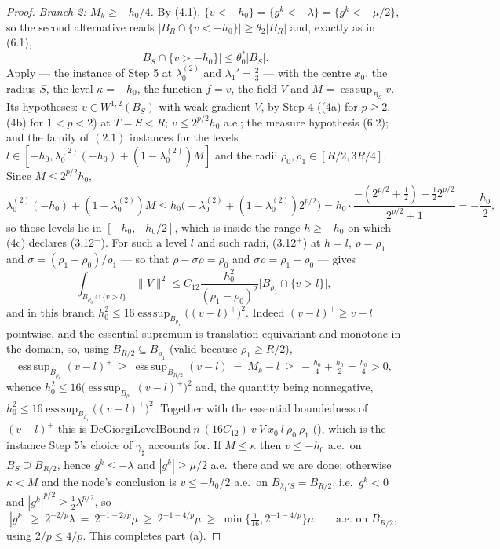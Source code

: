 \begin{proof}
\emph{Branch 2: $M_k\ge-h_0/4$.}  By (4.1),
$\{v<-h_0\}=\{g^k<-\lambda\}=\{g^k<-\mu/2\}$, so the second alternative reads
$|B_R\cap\{v<-h_0\}|\ge\theta_2|B_R|$ and, exactly as in (6.1),
\[
\bigl|B_S\cap\{v>-h_0\}\bigr|\le\theta_0^\ast|B_S| .
\tag{6.2}
\]
Apply  --- the instance of Step 5 at
$\lambda_0^{(2)}$ and $\lambda_1'=\tfrac23$ --- with the centre $x_0$, the
radius $S$, the level $\kappa=-h_0$, the function $f=v$, the field $V$ and
$M=\operatorname{ess\,sup}_{B_S}v$.  Its hypotheses: $v\in W^{1,2}(B_S)$ with
weak gradient $V$, by Step 4 ((4a) for $p\ge2$, (4b) for $1<p<2$) at $T=S<R$;
$v\le2^{p/2}h_0$ a.e.; the measure hypothesis (6.2); and the family of $(2.1)$
instances for the levels
$l\in[-h_0,\lambda_0^{(2)}(-h_0)+(1-\lambda_0^{(2)})M]$ and the radii
$\rho_0,\rho_1\in[R/2,3R/4]$.  Since $M\le2^{p/2}h_0$,
\[
\lambda_0^{(2)}(-h_0)+(1-\lambda_0^{(2)})M
\le h_0\bigl(-\lambda_0^{(2)}+(1-\lambda_0^{(2)})2^{p/2}\bigr)
= h_0\cdot\frac{-(2^{p/2}+\tfrac12)+\tfrac12 2^{p/2}}{2^{p/2}+1}
=-\frac{h_0}2 ,
\]
so those levels lie in $[-h_0,-h_0/2]$, which is inside the range $h\ge-h_0$ on
which (4c) declares (3.12$^+$).  For such a level $l$ and such radii,
(3.12$^+$) at $h=l$, $\rho=\rho_1$ and $\sigma=(\rho_1-\rho_0)/\rho_1$ --- so
that $\rho-\sigma\rho=\rho_0$ and $\sigma\rho=\rho_1-\rho_0$ --- gives
\[
\int_{B_{\rho_0}\cap\{v>l\}}\|V\|^2
\le C_{12}\frac{h_0^2}{(\rho_1-\rho_0)^2}\bigl|B_{\rho_1}\cap\{v>l\}\bigr| ,
\]
and in this branch $h_0^2\le16\operatorname{ess\,sup}_{B_{\rho_1}}\bigl((v-l)^+\bigr)^2$.
Indeed $(v-l)^+\ge v-l$ pointwise, and the essential supremum is translation
equivariant and monotone in the domain, so, using $B_{R/2}\subseteq B_{\rho_1}$
(valid because $\rho_1\ge R/2$),
\[
\operatorname{ess\,sup}_{B_{\rho_1}}(v-l)^+
\ \ge\ \operatorname{ess\,sup}_{B_{R/2}}(v-l)
\ =\ M_k-l\ \ge\ -\tfrac{h_0}4+\tfrac{h_0}2=\tfrac{h_0}4>0 ,
\]
whence $h_0^2\le16\bigl(\operatorname{ess\,sup}_{B_{\rho_1}}(v-l)^+\bigr)^2$ and,
the quantity being nonnegative, $h_0^2\le16\operatorname{ess\,sup}_{B_{\rho_1}}
\bigl((v-l)^+\bigr)^2$.  Together with the essential boundedness of $(v-l)^+$
this is
$\mathrm{DeGiorgiLevelBound}\ n\ (16C_{12})\ v\ V\ x_0\ l\ \rho_0\ \rho_1$
(), which is the instance Step 5's choice of
$\gamma_\sharp$ accounts for.  If $M\le\kappa$ then
$v\le-h_0$ a.e.\ on $B_S\supseteq B_{R/2}$, hence $g^k\le-\lambda$ and
$|g^k|\ge\mu/2$ a.e.\ there and we are done; otherwise $\kappa<M$ and the node's
conclusion is $v\le-h_0/2$ a.e.\ on $B_{\lambda_1'S}=B_{R/2}$, i.e.\ $g^k<0$ and
$|g^k|^{p/2}\ge\tfrac12\lambda^{p/2}$, so
\[
|g^k|\ \ge\ 2^{-2/p}\lambda\ =\ 2^{-1-2/p}\mu\ \ge\ 2^{-1-4/p}\mu
\ \ge\ \min\{\tfrac1{16},2^{-1-4/p}\}\mu
\qquad\text{a.e.\ on }B_{R/2},
\]
using $2/p\le4/p$.  This completes part (a).


\end{proof}
